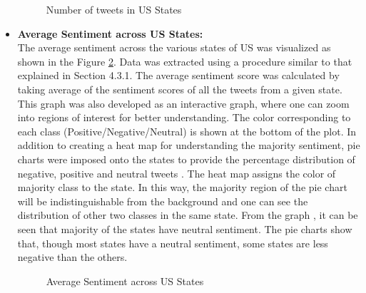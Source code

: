 \documentclass[9pt,twocolumn,twoside]{../../styles/osajnl}
\begin{document}
\begin{itemize}
\begin{figure}[htbp]
    \caption{Number of tweets in US States}
    \label{fig:ustweet}
    \end{figure}    
    \item \textbf{Average Sentiment across US States:}\\
    The average sentiment across the various states of US was visualized as shown in the Figure \ref{fig:ussenti}. Data was extracted using a procedure similar to that explained in Section 4.3.1. The average sentiment score was calculated by taking average of the sentiment scores of all the tweets from a given state. This graph was also developed as an interactive graph, where one can zoom into regions of interest for better understanding. The color corresponding to each class (Positive/Negative/Neutral) is shown at the bottom of the plot. In addition to creating a heat map for understanding the majority sentiment, pie charts were imposed onto the states to provide the percentage distribution of negative, positive and neutral tweets \cite{www-ussenti}. The heat map assigns the color of majority class to the state. In this way, the majority region of the pie chart will be indistinguishable from the background and one can see the distribution of other two classes in the same state. From the graph , it can be  seen that majority of the states have neutral sentiment. The pie charts show that, though most states have a neutral sentiment, some states are less negative than the others.
    \begin{figure}[htbp]
    \centering
    \caption{Average Sentiment across US States}
    \label{fig:ussenti}
    \end{figure}    
\end{itemize}  
\end{document}
